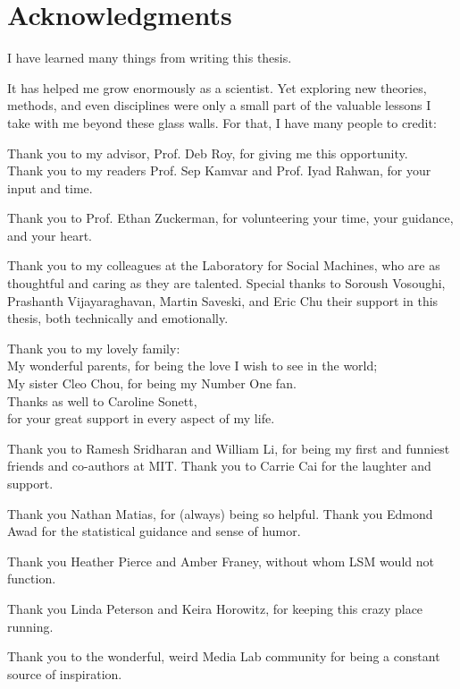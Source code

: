  
\section*{Acknowledgments}
I have learned many things from writing this thesis. 
 
It has helped me grow enormously as a scientist. Yet exploring new theories, methods, and even disciplines were only a small part of the valuable lessons I take with me beyond these glass walls. For that, I have many people to credit:
 

Thank you to my advisor, Prof. Deb Roy, for giving me this opportunity.\\
Thank you to my readers Prof. Sep Kamvar and Prof. Iyad Rahwan, for your input and time.

Thank you to Prof. Ethan Zuckerman, for volunteering your time, your guidance, and your heart. 

Thank you to my colleagues at the Laboratory for Social Machines, who are as thoughtful and caring as they are talented. Special thanks to Soroush Vosoughi, Prashanth Vijayaraghavan, Martin Saveski, and Eric Chu their support in this thesis, both technically and emotionally.

Thank you to my lovely family: \\
My wonderful parents, for being the love I wish to see in the world;  \\
My sister Cleo Chou, for being my Number One fan.  \\
Thanks as well to Caroline Sonett, \\ 
for your great support in every aspect of my life.
  
Thank you to Ramesh Sridharan and William Li, for being my first and funniest friends and co-authors at MIT. Thank you to Carrie Cai for the laughter and support.

Thank you Nathan Matias, for (always) being so helpful. Thank you Edmond Awad for the statistical guidance and sense of humor. 

Thank you Heather Pierce and Amber Franey, without whom LSM would not function.  

Thank you Linda Peterson and Keira Horowitz, for keeping this crazy place running.

Thank you to the wonderful, weird Media Lab community for being a constant source of inspiration.

